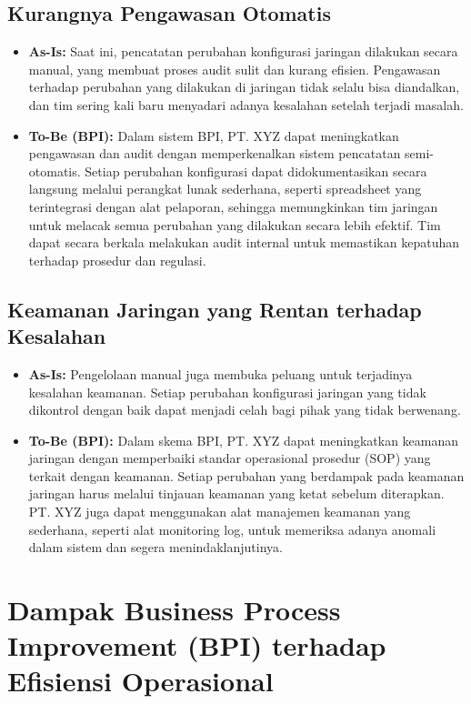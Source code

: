 \subsection{Kurangnya Pengawasan Otomatis}

\begin{itemize}
    \item \textbf{As-Is:} Saat ini, pencatatan perubahan konfigurasi jaringan dilakukan secara manual, yang membuat proses audit sulit dan kurang efisien. Pengawasan terhadap perubahan yang dilakukan di jaringan tidak selalu bisa diandalkan, dan tim sering kali baru menyadari adanya kesalahan setelah terjadi masalah.

    \item \textbf{To-Be (BPI):} Dalam sistem BPI, PT. XYZ dapat meningkatkan pengawasan dan audit dengan memperkenalkan sistem pencatatan semi-otomatis. Setiap perubahan konfigurasi dapat didokumentasikan secara langsung melalui perangkat lunak sederhana, seperti spreadsheet yang terintegrasi dengan alat pelaporan, sehingga memungkinkan tim jaringan untuk melacak semua perubahan yang dilakukan secara lebih efektif. Tim dapat secara berkala melakukan audit internal untuk memastikan kepatuhan terhadap prosedur dan regulasi.
\end{itemize}

\subsection{Keamanan Jaringan yang Rentan terhadap Kesalahan}

\begin{itemize}
    \item \textbf{As-Is:} Pengelolaan manual juga membuka peluang untuk terjadinya kesalahan keamanan. Setiap perubahan konfigurasi jaringan yang tidak dikontrol dengan baik dapat menjadi celah bagi pihak yang tidak berwenang.

    \item \textbf{To-Be (BPI):} Dalam skema BPI, PT. XYZ dapat meningkatkan keamanan jaringan dengan memperbaiki standar operasional prosedur (SOP) yang terkait dengan keamanan. Setiap perubahan yang berdampak pada keamanan jaringan harus melalui tinjauan keamanan yang ketat sebelum diterapkan. PT. XYZ juga dapat menggunakan alat manajemen keamanan yang sederhana, seperti alat monitoring log, untuk memeriksa adanya anomali dalam sistem dan segera menindaklanjutinya.
\end{itemize}

\section{Dampak Business Process Improvement (BPI) terhadap Efisiensi Operasional}

